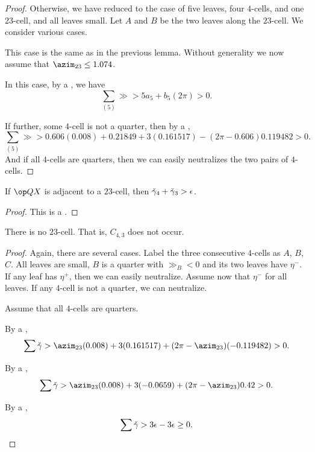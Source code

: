 \begin{proof}  Otherwise, we have reduced to the case of five leaves, four $4$-cells,
and one $23$-cell, and all leaves small.  Let $A$ and $B$ be the two leaves
along the $23$-cell.  We consider various cases.

  This case is the same as in the previous lemma.
Without generality we now assume that $\azim_{23}\le 1.074$.

  In this case,
by a , we have
\[
\sum_{(5)} \gg > 5 a_5 + b_5 (2\pi) > 0.
\]

  If further, some $4$-cell is not a quarter, then by a ,
\[
\sum_{(5)} \gg > 0.606 (0.008) + 0.21849 + 3 (0.161517) - (2\pi - 0.606) 0.119482 > 0.
\]
And if all $4$-cells are quarters, then we can easily neutralizes the two pairs of $4$-cells.
\end{proof}

\begin{lemma} If $\QX$ is adjacent to a $23$-cell, then
$\check\gamma_4 + \check\gamma_3 > \epsilon$.
\end{lemma}

\begin{proof} This is a .
\end{proof}

\begin{lemma} There is no $23$-cell.  That is, $C_{4,3}$ does not occur.
\end{lemma}

\begin{proof} Again, there are several cases.  Label the three consecutive $4$-cells
as $A$, $B$, $C$.  All leaves are small, $B$ is a quarter with $\gg_B<0$ and its two leaves have $\eta^-$.  If any leaf has $\eta^+$, then we can easily neutralize.  Assume now that $\eta^-$ for all leaves.  If any $4$-cell is not a quarter, we can neutralize.

Assume that all $4$-cells are quarters.  

  By a ,
\[
\sum\gg > \azim_{23} (0.008) + 3 (0.161517) + (2\pi - \azim_{23}) (-0.119482) > 0.
\]

  By a ,
\[
\sum\gg > \azim_{23} (0.008) + 3 (-0.0659) + (2\pi - \azim_{23}) 0.42 > 0.
\]

  By a ,
\[
\sum\check\gamma > 3\epsilon - 3\epsilon\ge 0.
\]
\end{proof}

